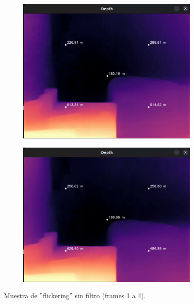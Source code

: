 \begin{figure}[H]
\begin{subfigure}[b]{0.45\textwidth}
        \includegraphics[width=\textwidth]{images/no_filter/frame_00016.png}
    \end{subfigure}
    \hfill
    \begin{subfigure}[b]{0.45\textwidth}
        \includegraphics[width=\textwidth]{images/no_filter/frame_00022.png}
    \end{subfigure}

    \caption{Muestra de ''flickering'' sin filtro (frames 1 a 4).}
    \label{fig:no_filter}
\end{figure}

